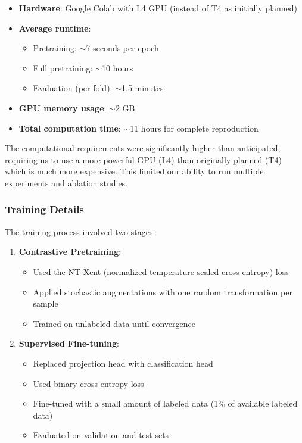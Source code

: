 \documentclass[10pt,letterpaper,twocolumn]{article}
\begin{document}
\begin{itemize}
    \item \textbf{Hardware}: Google Colab with L4 GPU (instead of T4 as initially planned)
    \item \textbf{Average runtime}: 
    \begin{itemize}
        \item Pretraining: $\sim$7 seconds per epoch
        \item Full pretraining: $\sim$10 hours
        \item Evaluation (per fold): $\sim$1.5 minutes
    \end{itemize}
    \item \textbf{GPU memory usage}: $\sim$2 GB
    \item \textbf{Total computation time}: $\sim$11 hours for complete reproduction
\end{itemize}

The computational requirements were significantly higher than anticipated, requiring us to use a more powerful GPU (L4) than originally planned (T4) which is much more expensive. This limited our ability to run multiple experiments and ablation studies.

\subsubsection{Training Details}

The training process involved two stages:

\begin{enumerate}
    \item \textbf{Contrastive Pretraining}:
    \begin{itemize}
        \item Used the NT-Xent (normalized temperature-scaled cross entropy) loss
        \item Applied stochastic augmentations with one random transformation per sample
        \item Trained on unlabeled data until convergence
    \end{itemize}
    
    \item \textbf{Supervised Fine-tuning}:
    \begin{itemize}
        \item Replaced projection head with classification head
        \item Used binary cross-entropy loss
        \item Fine-tuned with a small amount of labeled data (1\% of available labeled data)
        \item Evaluated on validation and test sets
    \end{itemize}
\end{enumerate}
\end{document}
